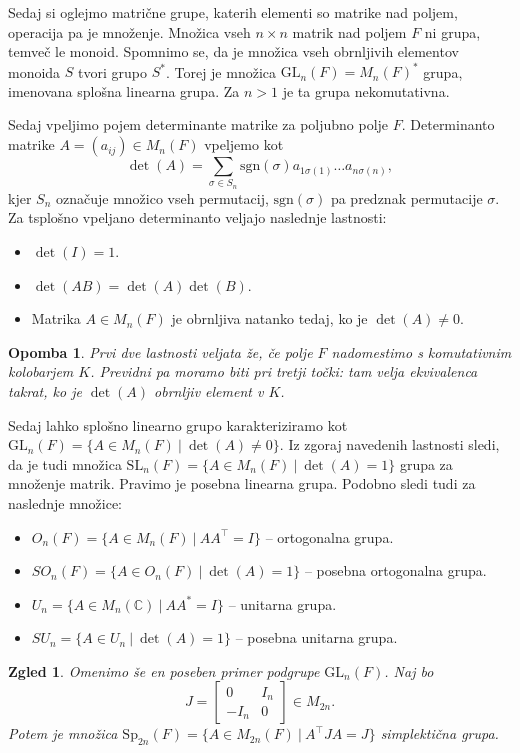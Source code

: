 \documentclass[10pt, a4paper]{article}
\newtheorem*{opomba}{Opomba}
\newtheorem{zgled}{Zgled}[section]
\newcommand{\C}{\mathbb {C}}
\begin{document}
Sedaj si oglejmo matrične grupe, katerih elementi so matrike nad poljem, operacija pa je množenje.
Množica vseh $n \times n$ matrik nad poljem $F$ ni grupa, temveč le monoid.
Spomnimo se, da je množica vseh obrnljivih elementov monoida $S$ tvori grupo $S^*$.
Torej je množica $\mathrm{GL}_n (F) = M_n(F)^*$ grupa, imenovana splošna linearna grupa.
Za $n > 1$ je ta grupa nekomutativna. 

Sedaj vpeljimo pojem determinante matrike za poljubno polje $F$.
Determinanto matrike $A = (a_{ij}) \in M_n (F)$ vpeljemo kot 
$$\det(A) = \sum_{\sigma \in S_n} \textrm{sgn$(\sigma)$} a_{1 \sigma(1)} \dots a_{n \sigma(n)},$$
kjer $S_n$ označuje množico vseh permutacij, \(\textrm{sgn$(\sigma)$}\) pa predznak permutacije $\sigma$.
Za tsplošno vpeljano determinanto veljajo naslednje lastnosti:
\begin{itemize}
  \item $\det(I) = 1$.
  \item $\det(AB) = \det(A) \det(B)$.
  \item Matrika $A \in M_n (F)$ je obrnljiva natanko tedaj, ko je $\det (A) \neq 0$.
\end{itemize}

\begin{opomba}
  Prvi dve lastnosti veljata že, če polje $F$ nadomestimo s komutativnim kolobarjem $K$.
  Previdni pa moramo biti pri tretji točki: tam velja ekvivalenca takrat, ko je $\det (A)$ obrnljiv element v $K$.
\end{opomba}

Sedaj lahko splošno linearno grupo karakteriziramo kot $\mathrm{GL}_n (F) = \{A \in M_n (F)\ |\ \det (A) \neq 0\}$.
Iz zgoraj navedenih lastnosti sledi, da je tudi množica $\mathrm{SL}_n (F) = \{A \in M_n (F)\ |\ \det (A) = 1\}$ grupa za množenje matrik.
Pravimo je posebna linearna grupa. Podobno sledi tudi za naslednje množice:
\begin{itemize}
  \item $O_n (F) = \{A \in M_n (F)\ |\ A A^\top = I\}$ -- ortogonalna grupa.
  \item ${SO}_n (F) = \{A \in O_n (F)\ |\ \det (A) = 1\}$ -- posebna ortogonalna grupa.
  \item $U_n  = \{A \in M_n (\C)\ |\ A A^* = I \}$ -- unitarna grupa.
  \item ${SU}_n = \{A \in U_n\ |\ \det (A) = 1\}$ -- posebna unitarna grupa.
\end{itemize}

\begin{zgled}
  Omenimo še en poseben primer podgrupe $\mathrm{GL}_n (F)$. Naj bo 
  $$J = \begin{bmatrix}
    0 & I_n\\
    -I_n & 0
  \end{bmatrix} \in M_{2n}.$$
  Potem je množica $\mathrm{Sp}_{2n} (F) = \{A \in M_{2n} (F)\ |\ A^\top J A = J\}$ simplektična grupa.
\end{zgled}
\end{document}
